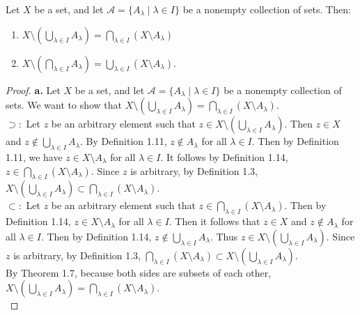 \documentclass[11pt]{article}
\begin{document}
\newpage
\begin{theorem}[1.15]
Let $X$ be a set, and let  $\mathcal{A}=\{A_\lambda\mid \lambda\in I\}$ be a nonempty collection of sets. Then:
\begin{enumerate}
\item
$X\setminus \left( \bigcup_{\lambda\in I}A_\lambda\right) =\bigcap_{\lambda\in I} (X\setminus A_\lambda)$

\item
$X\setminus \left( \bigcap_{\lambda\in I}A_\lambda\right)  =\bigcup_{\lambda\in I} (X\setminus A_\lambda).$
\end{enumerate}  
\end{theorem}
\begin{proof}
\textbf{a.} Let $X$ be a set, and let $\mathcal{A} = \{ A_{\lambda} \mid \lambda \in I \}$ be a nonempty collection of sets. We want to show that $X \setminus \left( \bigcup_{\lambda \in I} A_{\lambda}\right) = \bigcap_{\lambda \in I} ( X \setminus A_{\lambda} )$. \\
$\supset:$ Let $z$ be an arbitrary element such that $z \in X \setminus \left( \bigcup_{\lambda \in I} A_{\lambda} \right)$. Then $z \in X$ and $z \notin \bigcup_{\lambda \in I} A_{\lambda}$. By Definition 1.11, $z \notin A_{\lambda}$ for all $\lambda \in I$. Then by Definition 1.11, we have $z \in X \setminus A_{\lambda}$ for all $\lambda \in I$. It follows by Definition 1.14, $z \in \bigcap_{\lambda \in I} (X \setminus A_{\lambda})$. Since $z$ is arbitrary, by Definition 1.3, $X \setminus \left( \bigcup_{\lambda \in I} A_{\lambda} \right) \subset \bigcap_{\lambda \in I} (X \setminus A_{\lambda})$. \\
$\subset:$ Let $z$ be an arbitrary element such that $z \in \bigcap_{\lambda \in I} (X \setminus A_{\lambda})$. Then by Definition 1.14, $z \in X \setminus A_{\lambda}$ for all $\lambda \in I$. Then it follows that $z \in X$ and $z \notin A_{\lambda}$ for all $\lambda \in I$. Then by Definition 1.14, $z \notin \bigcup_{\lambda \in I} A_{\lambda}$. Thus $z \in X \setminus \left( \bigcup_{\lambda \in I} A_{\lambda} \right)$. Since $z$ is arbitrary, by Definition 1.3, $\bigcap_{\lambda \in I} (X \setminus A_{\lambda}) \subset X \setminus \left( \bigcup_{\lambda \in I} A_{\lambda} \right)$. \\
By Theorem 1.7, because both sides are subsets of each other, $X \setminus \left( \bigcup_{\lambda \in I} A_{\lambda}\right) = \bigcap_{\lambda \in I} ( X \setminus A_{\lambda} )$. \\


\end{proof}
\end{document}
